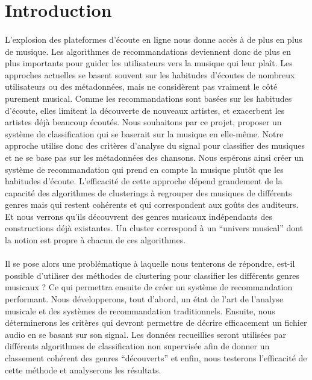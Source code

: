 \documentclass{ir}
\begin{document}
\pagebreak
\tableofcontents
\pagebreak

\section{Introduction}
\paragraph{}
L’explosion des plateformes d’écoute en ligne nous donne accès à de plus en plus de musique. 
Les algorithmes de recommandations deviennent donc de plus en plus importants pour guider les 
utilisateurs vers la musique qui leur plaît. Les approches actuelles se basent souvent sur les 
habitudes d’écoutes de nombreux utilisateurs ou des métadonnées, mais ne considèrent pas 
vraiment le côté purement musical. Comme les recommandations sont basées sur les habitudes d’écoute, elles limitent la découverte de nouveaux artistes, et exacerbent les artistes déjà beaucoup écoutés. Nous souhaitons par ce projet, proposer un système de classification qui se baserait sur la
musique en elle-même. Notre approche utilise donc des critères d’analyse du signal pour 
classifier des musiques et ne se base pas sur les métadonnées des chansons. Nous espérons 
ainsi créer un système de recommandation qui prend en compte la musique plutôt que les 
habitudes d’écoute. L’efficacité de cette approche dépend grandement de la capacité des 
algorithmes de clusterings à regrouper des musiques de différents genres mais qui restent 
cohérents et qui correspondent aux goûts des auditeurs. Et nous verrons qu’ils découvrent des 
genres musicaux indépendants des constructions déjà existantes. Un cluster correspond à un 
“univers musical” dont la notion est propre à chacun de ces algorithmes. 

\paragraph{}
Il se pose alors une 
problématique à laquelle nous tenterons de répondre, est-il possible d’utiliser des méthodes 
de clustering pour classifier les différents genres musicaux ? Ce qui permettra ensuite de 
créer un système de recommandation performant. Nous développerons, tout d’abord, un état de 
l’art de l’analyse musicale et des systèmes de recommandation traditionnels. Ensuite, nous 
déterminerons les critères qui devront permettre de décrire efficacement un fichier audio en 
se basant sur son signal. Les données recueillies seront utilisées par différents algorithmes 
de classification non supervisée afin de donner un classement cohérent des genres “découverts” 
et enfin, nous testerons l’efficacité de cette méthode et analyserons les résultats.
\end{document}
